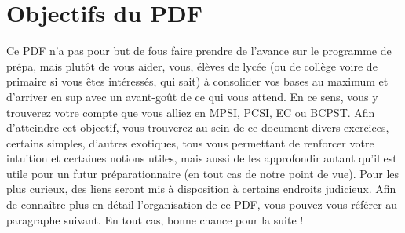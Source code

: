 \documentclass[a4paper]{report}
\begin{document}
	\section{Objectifs du PDF}
		Ce PDF n'a pas pour but de fous faire prendre de l'avance sur le programme de prépa, mais plutôt de vous aider, vous, élèves de lycée (ou de collège voire de primaire si vous êtes intéressés, qui sait) à consolider vos bases au maximum et d'arriver en sup avec un avant-goût de ce qui vous attend. En ce sens, vous y trouverez votre compte que vous alliez en MPSI, PCSI, EC ou BCPST. Afin d'atteindre cet objectif, vous trouverez au sein de ce document divers exercices, certains simples, d'autres exotiques, tous vous permettant de renforcer votre intuition et certaines notions utiles, mais aussi de les approfondir autant qu'il est utile pour un futur préparationnaire (en tout cas de notre point de vue). Pour les plus curieux, des liens seront mis à disposition à certains endroits judicieux. Afin de connaître plus en détail l'organisation de ce PDF, vous pouvez vous référer au paragraphe suivant. En tout cas, bonne chance pour la suite !
		
\end{document}
